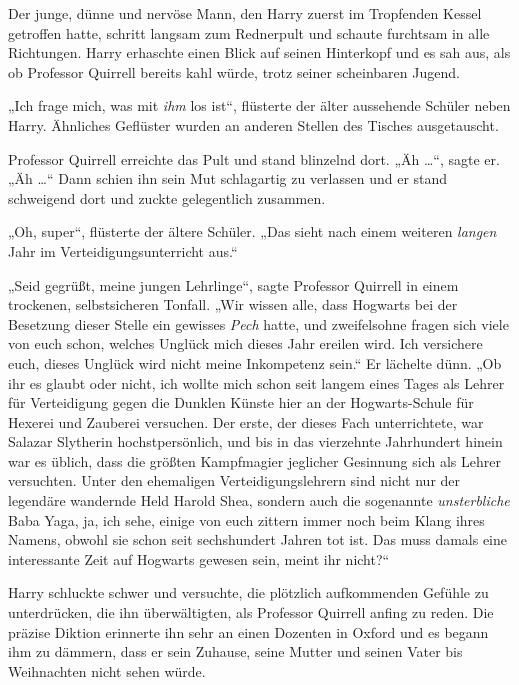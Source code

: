 Der junge, dünne und nervöse Mann, den Harry zuerst im Tropfenden Kessel getroffen hatte, schritt langsam zum Rednerpult und schaute furchtsam in alle Richtungen. Harry erhaschte einen Blick auf seinen Hinterkopf und es sah aus, als ob Professor Quirrell bereits kahl würde, trotz seiner scheinbaren Jugend.

„Ich frage mich, was mit \emph{ihm} los ist“, flüsterte der älter aussehende Schüler neben Harry. Ähnliches Geflüster wurden an anderen Stellen des Tisches ausgetauscht.

Professor Quirrell erreichte das Pult und stand blinzelnd dort. „Äh …“, sagte er. „Äh …“ Dann schien ihn sein Mut schlagartig zu verlassen und er stand schweigend dort und zuckte gelegentlich zusammen.

„Oh, super“, flüsterte der ältere Schüler. „Das sieht nach einem weiteren \emph{langen} Jahr im Verteidigungsunterricht aus.“

„Seid gegrüßt, meine jungen Lehrlinge“, sagte Professor Quirrell in einem trockenen, selbstsicheren Tonfall. „Wir wissen alle, dass Hogwarts bei der Besetzung dieser Stelle ein gewisses \emph{Pech} hatte, und zweifelsohne fragen sich viele von euch schon, welches Unglück mich dieses Jahr ereilen wird. Ich versichere euch, dieses Unglück wird nicht meine Inkompetenz sein.“ Er lächelte dünn. „Ob ihr es glaubt oder nicht, ich wollte mich schon seit langem eines Tages als Lehrer für Verteidigung gegen die Dunklen Künste hier an der Hogwarts-Schule für Hexerei und Zauberei versuchen. Der erste, der dieses Fach unterrichtete, war Salazar Slytherin hochstpersönlich, und bis in das vierzehnte Jahrhundert hinein war es üblich, dass die größten Kampfmagier jeglicher Gesinnung sich als Lehrer versuchten. Unter den ehemaligen Verteidigungslehrern sind nicht nur der legendäre wandernde Held Harold Shea, sondern auch die sogenannte \emph{unsterbliche} Baba Yaga, ja, ich sehe, einige von euch zittern immer noch beim Klang ihres Namens, obwohl sie schon seit sechshundert Jahren tot ist. Das muss damals eine interessante Zeit auf Hogwarts gewesen sein, meint ihr nicht?“

Harry schluckte schwer und versuchte, die plötzlich aufkommenden Gefühle zu unterdrücken, die ihn überwältigten, als Professor Quirrell anfing zu reden. Die präzise Diktion erinnerte ihn sehr an einen Dozenten in Oxford und es begann ihm zu dämmern, dass er sein Zuhause, seine Mutter und seinen Vater bis Weihnachten nicht sehen würde.

